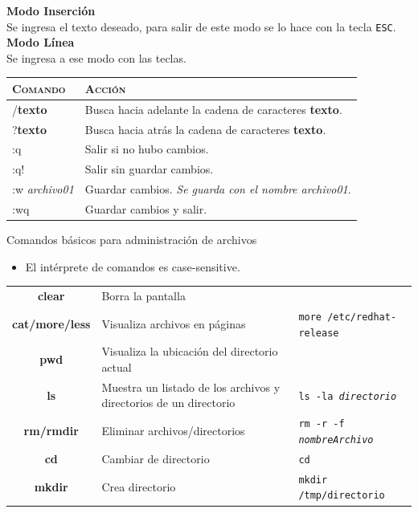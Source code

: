 \documentclass{beamer}
\begin{document}
\begin{frame}
\textbf{Modo Inserción}\\
Se ingresa el texto deseado, para salir de este modo se lo hace con la tecla \texttt{ESC}.\\[0.5cm]
\textbf{Modo Línea}\\
Se ingresa a ese modo con las teclas.
{\scriptsize
\begin{tabular}{l|l}
\textsc{Comando}&\textsc{Acción}  \\\hline
/\textbf{texto} & Busca hacia adelante la cadena de caracteres \textbf{texto}.\\\hline
?\textbf{texto} & Busca hacia atrás la cadena de caracteres \textbf{texto}.\\\hline
:q & Salir si no hubo cambios. \\\hline
:q! & Salir sin guardar cambios.\\\hline
:w \textit{archivo01} & Guardar cambios. \textit{Se guarda con el nombre archivo01}.\\\hline
:wq & Guardar cambios y salir.

\end{tabular}
}
\end{frame}
\begin{frame}{Comandos básicos para administración de archivos}
\begin{itemize}
    \item El intérprete de comandos es \textit{}{case-sensitive}.
\end{itemize}
{\scriptsize
\begin{tabular}{c|p{5cm}|l}
\hline
\textbf{clear} & Borra la pantalla   &\\
\textbf{cat/more/less}  & Visualiza archivos en páginas  & \texttt{more /etc/redhat-release}\\
\textbf{pwd} & Visualiza la ubicación del directorio actual   &\\
\textbf{ls} & Muestra un listado de los archivos y directorios de un directorio   & \texttt{ls -la \textit{directorio} }\\
\textbf{rm/rmdir} & Eliminar archivos/directorios   & \texttt{rm -r -f  \textit{nombreArchivo}}\\
\textbf{cd} & Cambiar de directorio   & \texttt{cd} \\
\textbf{mkdir} & Crea directorio   & \texttt{mkdir /tmp/directorio} 
\end{tabular}
 }   
\end{frame}
\end{document}
